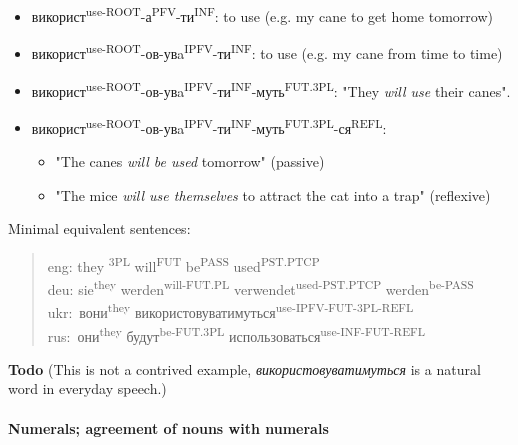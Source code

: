 \begin{itemize}
\tightlist
\item
  використ\textsuperscript{use-ROOT}-а\textsuperscript{PFV}-ти\textsuperscript{INF}: to use
  (e.g. my cane to get home tomorrow)
\item
  використ\textsuperscript{use-ROOT}-ов\textsuperscript{}-увa\textsuperscript{IPFV}-ти\textsuperscript{INF}:
  to use (e.g. my cane from time to time)
\item
  використ\textsuperscript{use-ROOT}-ов\textsuperscript{}-увa\textsuperscript{IPFV}-ти\textsuperscript{INF}-муть\textsuperscript{FUT.3PL}:
  "They \emph{will use} their canes".
\item
  використ\textsuperscript{use-ROOT}-ов\textsuperscript{}-увa\textsuperscript{IPFV}-ти\textsuperscript{INF}-муть\textsuperscript{FUT.3PL}-ся\textsuperscript{REFL}:

  \begin{itemize}
  \tightlist
  \item
    "The canes \emph{will be used} tomorrow" (passive)
  \item
    "The mice \emph{will use themselves} to attract the cat into a trap"
    (reflexive)
  \end{itemize}
\end{itemize}

Minimal equivalent sentences:

\begin{quote}
eng: they \textsuperscript{3PL} will\textsuperscript{FUT} be\textsuperscript{PASS}
used\textsuperscript{PST.PTCP}\\
deu: sie\textsuperscript{they} werden\textsuperscript{will-FUT.PL}
verwendet\textsuperscript{used-PST.PTCP} werden\textsuperscript{be-PASS}\\
ukr: вони\textsuperscript{they}
використовуватимуться\textsuperscript{use-IPFV-FUT-3PL-REFL}\\
rus: они\textsuperscript{they} будут\textsuperscript{be-FUT.3PL}
использоваться\textsuperscript{use-INF-FUT-REFL}
\end{quote}

\textbf{Todo} (This is not a contrived example,
\emph{використовуватимуться} is a natural word in everyday speech.)

\paragraph{Numerals; agreement of nouns with
numerals}\label{numerals-agreement-of-nouns-with-numerals}

